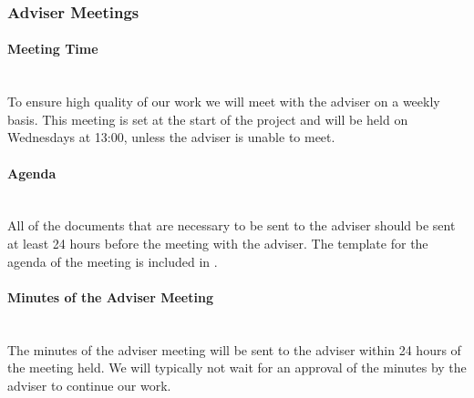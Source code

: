 \documentclass[../document.tex]{subfiles}
\begin{document}
\subsubsection{Adviser Meetings}
\paragraph{Meeting Time} \ \\
To ensure high quality of our work we will meet with the adviser on a weekly basis. This meeting is set at the start of the project and will be held on Wednesdays at 13:00, unless the adviser is unable to meet.

\paragraph{Agenda} \ \\
All of the documents that are necessary to be sent to the adviser should be sent at least 24 hours before the meeting with the adviser. The template for the agenda of the meeting is included in .

\paragraph{Minutes of  the Adviser Meeting} \ \\
The minutes of the adviser meeting will be sent to the adviser within 24 hours of the meeting held. We will typically not wait for an approval of the minutes by the adviser to continue our work.
\end{document}
